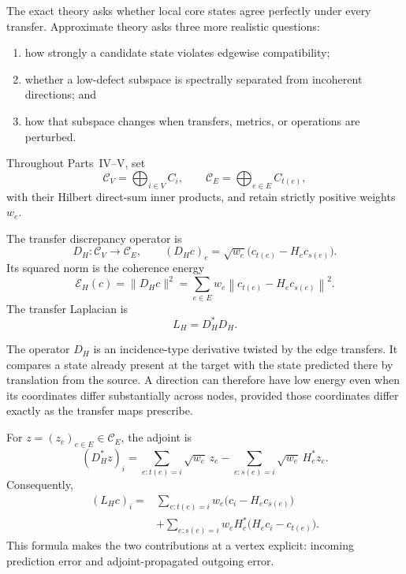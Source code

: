 
The exact theory asks whether local core states agree perfectly under every
transfer. Approximate theory asks three more realistic questions:
\begin{enumerate}
\item how strongly a candidate state violates edgewise compatibility;
\item whether a low-defect subspace is spectrally separated from incoherent
 directions; and
\item how that subspace changes when transfers, metrics, or operations are
 perturbed.
\end{enumerate}
Throughout Parts~IV--V, set
\[
\mathcal C_V=\bigoplus_{i\in V}C_i,
\qquad
\mathcal C_E=\bigoplus_{e\in E}C_{t(e)},
\]
with their Hilbert direct-sum inner products, and retain strictly positive
weights \(w_e\).


\begin{definition}\label{def:transfer-discrepancy}
The transfer discrepancy operator is
\[
D_H:\mathcal C_V\longrightarrow\mathcal C_E,
\qquad
(D_Hc)_e
=
\sqrt{w_e}\bigl(c_{t(e)}-H_ec_{s(e)}\bigr).
\]
Its squared norm is the coherence energy
\[
\boxed{
\mathcal E_H(c)
=
\|D_Hc\|^2
=
\sum_{e\in E}w_e
\left\|c_{t(e)}-H_ec_{s(e)}\right\|^2.
}
\]
The transfer Laplacian is
\[
\boxed{L_H=D_H^*D_H.}
\]
\end{definition}

The operator \(D_H\) is an incidence-type derivative twisted by the edge
transfers. It compares a state already present at the target with the state
predicted there by translation from the source. A direction can therefore
have low energy even when its coordinates differ substantially across nodes,
provided those coordinates differ exactly as the transfer maps prescribe.

For \(z=(z_e)_{e\in E}\in\mathcal C_E\), the adjoint is
\[
(D_H^*z)_i
=
\sum_{e:t(e)=i}\sqrt{w_e}\,z_e
-
\sum_{e:s(e)=i}\sqrt{w_e}\,H_e^*z_e.
\]
Consequently,
\[
\boxed{
\begin{aligned}
(L_Hc)_i
={}&
\sum_{e:t(e)=i}w_e\bigl(c_i-H_ec_{s(e)}\bigr)\\
&+
\sum_{e:s(e)=i}w_eH_e^*
\bigl(H_ec_i-c_{t(e)}\bigr).
\end{aligned}
}
\]
This formula makes the two contributions at a vertex explicit: incoming
prediction error and adjoint-propagated outgoing error.

